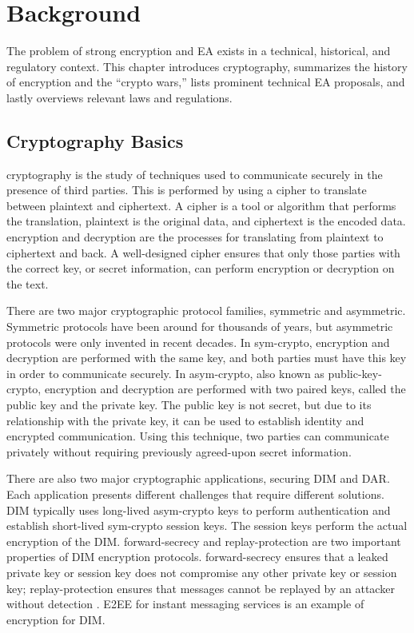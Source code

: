 \chapter{Background}
\label{chap-background}

The problem of strong encryption and \acl{EA} exists in a technical, historical, and regulatory context. This chapter
introduces cryptography, summarizes the history of encryption and the ``crypto wars,'' lists prominent technical \ac{EA}
proposals, and lastly overviews relevant laws and regulations.



\section{Cryptography Basics}
\label{sec-crypto-basics}

\Ac{cryptography} is the study of techniques used to communicate securely in the presence of third parties. This is
performed by using a \ac{cipher} to translate between \ac{plaintext} and \ac{ciphertext}. A cipher is a tool or
algorithm that performs the translation, plaintext is the original data, and ciphertext is the encoded data.
\Ac{encryption} and \ac{decryption} are the processes for translating from plaintext to ciphertext and back. A
well-designed cipher ensures that only those parties with the correct \ac{key}, or secret information, can perform
encryption or decryption on the text.


There are two major cryptographic protocol families, symmetric and asymmetric. Symmetric protocols have been around for
thousands of years, but asymmetric protocols were only invented in recent decades. In \ac{sym-crypto}, encryption and
decryption are performed with the same key, and both parties must have this key in order to communicate securely. In
\ac{asym-crypto}, also known as \ac{public-key-crypto}, encryption and decryption are performed with two paired keys,
called the public key and the private key. The public key is not secret, but due to its relationship with the private
key, it can be used to establish identity and encrypted communication. Using this technique, two parties can communicate
privately without requiring previously agreed-upon secret information.

There are also two major cryptographic applications, securing \ac{DIM} and \ac{DAR}. Each application presents different
challenges that require different solutions. \Ac{DIM} typically uses long-lived \ac{asym-crypto} keys to perform
authentication and establish short-lived \ac{sym-crypto} session keys. The session keys perform the actual encryption of
the \acl{DIM}. \Ac{forward-secrecy} and \ac{replay-protection} are two important properties of \ac{DIM} encryption
protocols. \Ac{forward-secrecy} ensures that a leaked private key or session key does not compromise any other private
key or session key; \ac{replay-protection} ensures that messages cannot be replayed by an attacker without detection
\cite{bellovin_thinking_2016}. \Ac{E2EE} for instant messaging services is an example of encryption for \ac{DIM}.

